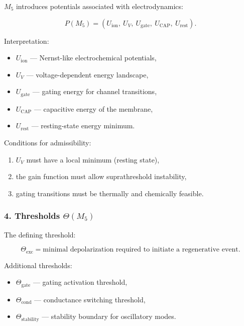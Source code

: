 $M_5$ introduces potentials associated with electrodynamics:

\[
P(M_5) =
(U_{\mathrm{ion}},\ U_V,\ U_{\mathrm{gate}},\
U_{\mathrm{CAP}},\ U_{\mathrm{rest}}).
\]

Interpretation:

\begin{itemize}
    \item $U_{\mathrm{ion}}$ — Nernst-like electrochemical potentials,
    \item $U_V$ — voltage-dependent energy landscape,
    \item $U_{\mathrm{gate}}$ — gating energy for channel transitions,
    \item $U_{\mathrm{CAP}}$ — capacitive energy of the membrane,
    \item $U_{\mathrm{rest}}$ — resting-state energy minimum.
\end{itemize}

Conditions for admissibility:

\begin{enumerate}
    \item $U_V$ must have a local minimum (resting state),
    \item the gain function must allow suprathreshold instability,
    \item gating transitions must be thermally and chemically feasible.
\end{enumerate}

\subsubsection*{4. Thresholds \texorpdfstring{$\Theta(M_5)$}{\Theta(M_5)}}

The defining threshold:

\[
\Theta_{\mathrm{exc}} = \text{minimal depolarization required to initiate a regenerative event}.
\]

Additional thresholds:

\begin{itemize}
    \item $\Theta_{\mathrm{gate}}$ — gating activation threshold,
    \item $\Theta_{\mathrm{cond}}$ — conductance switching threshold,
    \item $\Theta_{\mathrm{stability}}$ — stability boundary for oscillatory modes.
\end{itemize}

